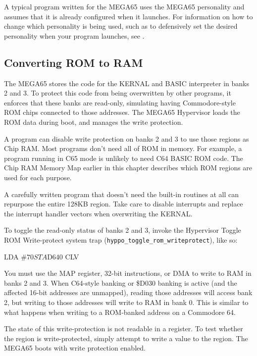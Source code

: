 A typical program written for the MEGA65 uses the MEGA65 personality and assumes that it is already configured when it launches. For information on how to change which personality is being used, such as to defensively set the desired personality when your program launches, see .

\subsection{Converting ROM to RAM}

The MEGA65 stores the code for the KERNAL and BASIC interpreter in banks 2 and 3. To protect this code from being overwritten by other programs, it enforces that these banks are read-only, simulating having Commodore-style ROM chips connected to those addresses. The MEGA65 Hypervisor loads the ROM data during boot, and manages the write protection.

A program can disable write protection on banks 2 and 3 to use those regions as Chip RAM. Most programs don't need all of ROM in memory. For example, a program running in C65 mode is unlikely to need C64 BASIC ROM code. The Chip RAM Memory Map earlier in this chapter describes which ROM regions are used for each purpose.

A carefully written program that doesn't need the built-in routines at all can repurpose the entire 128KB region. Take care to disable interrupts and replace the interrupt handler vectors when overwriting the KERNAL.

To toggle the read-only status of banks 2 and 3, invoke the Hypervisor Toggle ROM Write-protect system trap ({\tt hyppo\_toggle\_rom\_writeprotect}), like so:

\begin{asmcode}
LDA #$70
STA $D640
CLV
\end{asmcode}

You must use the MAP register, 32-bit instructions, or DMA to write to RAM in banks 2 and 3. When C64-style banking or \$D030 banking is active (and the affected 16-bit addresses are unmapped), reading those addresses will access bank 2, but writing to those addresses will write to RAM in bank 0. This is similar to what happens when writing to a ROM-banked address on a Commodore 64.

The state of this write-protection is not readable in a register. To test whether the region is write-protected, simply attempt to write a value to the region. The MEGA65 boots with write protection enabled.

